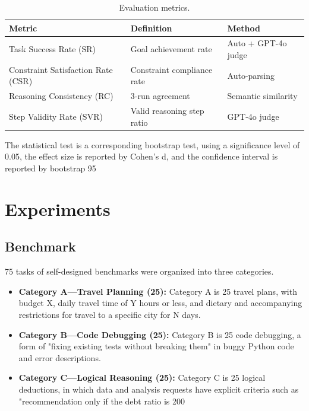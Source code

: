 \documentclass[11pt,a4paper]{article}
\begin{document}
\begin{table}[h]
\centering
\caption{Evaluation metrics.}
\label{tab:metrics}
\begin{tabular}{lll}
\toprule
\textbf{Metric} & \textbf{Definition} & \textbf{Method} \\
\midrule
Task Success Rate (SR) & Goal achievement rate & Auto + GPT-4o judge \\
Constraint Satisfaction Rate (CSR) & Constraint compliance rate & Auto-parsing \\
Reasoning Consistency (RC) & 3-run agreement & Semantic similarity \\
Step Validity Rate (SVR) & Valid reasoning step ratio & GPT-4o judge \\
\bottomrule
\end{tabular}
\end{table}

The statistical test is a corresponding bootstrap test, using a significance level of 0.05, the effect size is reported by Cohen's d, and the confidence interval is reported by bootstrap 95%

\section{Experiments}

\subsection{Benchmark}

75 tasks of self-designed benchmarks were organized into three categories.

\begin{itemize}[leftmargin=2em]
  \item \textbf{Category A---Travel Planning (25):} Category A is 25 travel plans, with budget X, daily travel time of Y hours or less, and dietary and accompanying restrictions for travel to a specific city for N days.
  \item \textbf{Category B---Code Debugging (25):} Category B is 25 code debugging, a form of "fixing existing tests without breaking them" in buggy Python code and error descriptions.
  \item \textbf{Category C---Logical Reasoning (25):} Category C is 25 logical deductions, in which data and analysis requests have explicit criteria such as "recommendation only if the debt ratio is 200%
\end{itemize}
\end{document}
